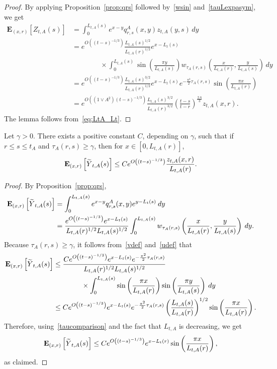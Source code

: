 \documentclass[AHL,Unicode,longabstracts,published]{cedram}
\newcommand*\E{\mathbf{E}}
\newcommand{\1} {\mathds{1}}
\let\oldtilde\tilde
\renewcommand*{\tilde}[1]{\mathchoice{\widetilde{#1}}{\widetilde{#1}}{\oldtilde{#1}}{\oldtilde{#1}}}
\begin{document}
\begin{proof}
By applying Proposition~\ref{prop:qrs} followed by~\eqref{wsin} and~\eqref{tauLexpasym}, we get
\begin{align*}
\E_{(x,r)}\left[Z_{t,A}(s)\right] &= \int_0^{L_{t,A}(s)} e^{x-y} q_{r,s}^A(x,y) z_{t,A}(y,s)\,dy\\
&=e^{O\left((t - s)^{-1/3}\right)} \frac{L_{t,A}(s)^{1/2}}{L_{t,A}(r)^{1/2}} e^{x-L_t(s)} \\
&\qquad \qquad \times \int_0^{L_{t,A}(s)} \sin\left(\frac{\pi y}{L_{t,A}(s)} \right) w_{\tau_A(r,s)} \left(\frac{x}{L_{t,A}(r)}, \frac{y}{L_{t,A}(s)} \right)\,dy \\
&=e^{O\left((t - s)^{-1/3}\right)} \frac{L_{t,A}(s)^{3/2}}{L_{t,A}(r)^{1/2}} e^{x-L_t(s)} e^{-\frac{\pi^2}2\tau_A(r,s)}\sin\left(\frac{\pi x}{L_{t,A}(r)} \right) \\
&=e^{O\left(\left(1 \vee A^2\right)(t - s)^{-1/3}\right)} \frac{L_{t,A}(s)^{3/2}}{L_{t,A}(r)^{3/2}} \left(\frac{t - s}{t-r} \right)^{\frac{2A} 3} z_{t,A}(x,r).
\end{align*}
The lemma follows from~\eqref{eq:LtA_Lt}.
\end{proof}

\begin{lemm}\label{lem:Yexp}
Let $\gamma > 0$. There exists a positive constant $C$, depending on $\gamma$, such that if $r\le s\le t_A$ and $\tau_A(r,s) \geq \gamma$, then for $x\in[0,L_{t,A}(r)]$,
\[
\E_{(x,r)}\left[{\tilde Y}_{t,A}(s)\right] \leq C e^{O\left((t - s)^{-1/3}\right)} \frac{z_{t,A}(x,r)}{L_{t,A}(r)}.
\]
\end{lemm}

\begin{proof}
By Proposition~\ref{prop:qrs},
\begin{align*}
\E_{(x,r)}\left[{\tilde Y}_{t,A}(s)\right] &= \int_0^{L_{t,A}(s)} e^{x-y} q^A_{r,s}(x,y) e^{y - L_t(s)} \: dy \\
&= \frac{e^{O\left((t - s)^{-1/3}\right)} e^{x - L_t(s)}}{L_{t,A}(r)^{1/2} L_{t,A}(s)^{1/2}} \int_0^{L_{t,A}(s)} w_{\tau_A(r,s)} \left(\frac{x}{L_{t,A}(r)}, \frac{y}{L_{t,A}(s)} \right) \: dy.
\end{align*}
Because $\tau_A(r,s) \geq \gamma$, it follows from~\eqref{vdef} and~\eqref{udef} that
\begin{align*}
\E_{(x,r)}\left[{\tilde Y}_{t,A}(s)\right] &\leq \frac{C e^{O\left((t - s)^{-1/3}\right)}e^{x - L_t(s)} e^{-\frac{\pi^2}{2} \tau_A(r,s)}}{L_{t,A}(r)^{1/2} L_{t,A}(s)^{1/2}} \\
&\qquad \qquad \times \int_0^{L_{t,A}(s)} \sin \left(\frac{\pi x}{L_{t,A}(r)} \right) \sin \left(\frac{\pi y}{L_{t,A}(s)} \right) \: dy \\
&\leq C e^{O\left((t - s)^{-1/3}\right)}e^{x - L_t(s)} e^{-\frac{\pi^2}{2} \tau_A(r,s)} \left(\frac{L_{t,A}(s)}{L_{t,A}(r)} \right)^{1/2} \sin \left(\frac{\pi x}{L_{t,A}(r)}\right).
\end{align*}
Therefore, using~\eqref{taucomparison} and the fact that $L_{t,A}$ is decreasing, we get
\[
\E_{(x,r)}\left[{\tilde Y}_{t,A}(s)\right] \leq C e^{O\left((t - s)^{-1/3}\right)} e^{x - L_t(r)} \sin \left(\frac{\pi x}{L_{t,A}(r)} \right),
\]
as claimed.
\end{proof}
\end{document}
